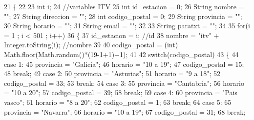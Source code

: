 \begin{DoxyCode}
21     \{
22         
23         \textcolor{keywordtype}{int} i;
24         \textcolor{comment}{//variables ITV}
25         \textcolor{keywordtype}{int} id\_estacion = 0;
26         String nombre = \textcolor{stringliteral}{""};
27         String direccion = \textcolor{stringliteral}{""};
28         \textcolor{keywordtype}{int} codigo\_postal = 0;
29         String provincia = \textcolor{stringliteral}{""};
30         String horario = \textcolor{stringliteral}{""};
31         String email = \textcolor{stringliteral}{""};
32         
33         String paratxt = \textcolor{stringliteral}{""};
34         
35         \textcolor{keywordflow}{for}(i = 1 ; i < 501 ; i++)
36         \{
37             id\_estacion = i;    \textcolor{comment}{//id}
38             nombre = \textcolor{stringliteral}{"itv"} + Integer.toString(i);   \textcolor{comment}{//nombre}
39             
40             codigo\_postal =  (int) Math.floor(Math.random()*(19-1+1)+1);    
41             
42             \textcolor{keywordflow}{switch}(codigo\_postal)
43             \{
44                     \textcolor{keywordflow}{case} 1:
45                     provincia = \textcolor{stringliteral}{"Galicia"};
46                     horario = \textcolor{stringliteral}{"10 a 19"};
47                     codigo\_postal = 15;
48                     \textcolor{keywordflow}{break};
49                     \textcolor{keywordflow}{case} 2:
50                     provincia = \textcolor{stringliteral}{"Asturias"};
51                     horario = \textcolor{stringliteral}{"9 a 18"};
52                     codigo\_postal = 33;
53                     \textcolor{keywordflow}{break};
54                     \textcolor{keywordflow}{case} 3:
55                     provincia = \textcolor{stringliteral}{"Cantabria"};
56                     horario = \textcolor{stringliteral}{"10 a 20"};
57                     codigo\_postal = 39;
58                     \textcolor{keywordflow}{break};
59                     \textcolor{keywordflow}{case} 4:
60                     provincia = \textcolor{stringliteral}{"Pais vasco"};
61                     horario = \textcolor{stringliteral}{"8 a 20"};
62                     codigo\_postal = 1;
63                     \textcolor{keywordflow}{break};
64                     \textcolor{keywordflow}{case} 5:
65                     provincia = \textcolor{stringliteral}{"Navarra"};
66                     horario = \textcolor{stringliteral}{"10 a 19"};
67                     codigo\_postal = 31;
68                     \textcolor{keywordflow}{break};

\end{DoxyCode}
